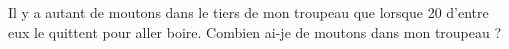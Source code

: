 Il y a autant de moutons dans le tiers de mon troupeau que lorsque 20 d'entre eux le quittent pour aller boire. 
Combien ai-je de moutons dans mon troupeau ?